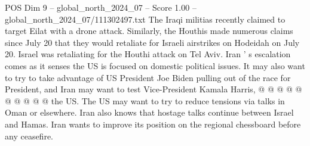 \begin{textsample}{POS Dim 9 – global\_north\_2024\_07 – Score 1.00 – global\_north\_2024\_07/111302497.txt}
The Iraqi militias recently claimed to target Eilat with a drone attack.
Similarly, the Houthis made numerous claims since July 20 that they would retaliate for Israeli airstrikes on Hodeidah on July 20.
Israel was retaliating for the Houthi attack on Tel Aviv.
Iran ' s escalation comes as it senses the US is focused on domestic political issues.
It may also want to try to take advantage of US President Joe Biden pulling out of the race for President, and Iran may want to test Vice-President Kamala Harris, @ @ @ @ @ @ @ @ @ @ the US.
The US may want to try to reduce tensions via talks in Oman or elsewhere.
Iran also knows that hostage talks continue between Israel and Hamas.
Iran wants to improve its position on the regional chessboard before any ceasefire.

\end{textsample}
